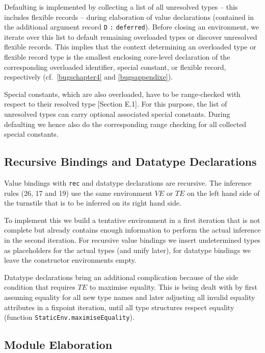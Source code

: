 \documentclass[twoside,titlepage]{article}
\begin{document}
Defaulting is implemented by collecting a list of all unresolved types -- this includes flexible records -- during elaboration of value declarations (contained in the additional argument record {\tt D} {\tt :} {\tt deferred}). Before closing an environment, we iterate over this list to default remaining overloaded types or discover unresolved flexible records. This implies that the context determining an overloaded type or flexible record type is the smallest enclosing core-level declaration of the corresponding overloaded identifier, special constant, or flexible record, respectively (cf.\ \ref{bugschapter4} and \ref{bugsappendixe}).

Special constants, which are also overloaded, have to be range-checked with respect to their resolved type [Section E.1]. For this purpose, the list of unresolved types can carry optional associated special constants. During defaulting we hence also do the corresponding range checking for all collected special constants.


\subsection{Recursive Bindings and Datatype Declarations}
\label{recursive}
\label{datatype}

Value bindings with {\tt rec} and datatype declarations are recursive. The inference rules (26, 17 and 19) use the same environment $\mathit{VE}$ or $\mathit{TE}$ on the left hand side of the turnstile that is to be inferred on its right hand side.

To implement this we build a tentative environment in a first iteration that is not complete but already contains enough information to perform the actual inference in the second iteration. For recursive value bindings we insert undetermined types as placeholders for the actual types (and unify later), for datatype bindings we leave the constructor environments empty.

Datatype declarations bring an additional complication because of the side condition that requires $\mathit{TE}$ to maximise equality. This is being dealt with by first assuming equality for all new type names and later adjusting all invalid equality attributes in a fixpoint iteration, until all type structures respect equality (function {\tt StaticEnv.maximiseEquality}).


\subsection{Module Elaboration}
\label{moduleelaboration}
\end{document}
